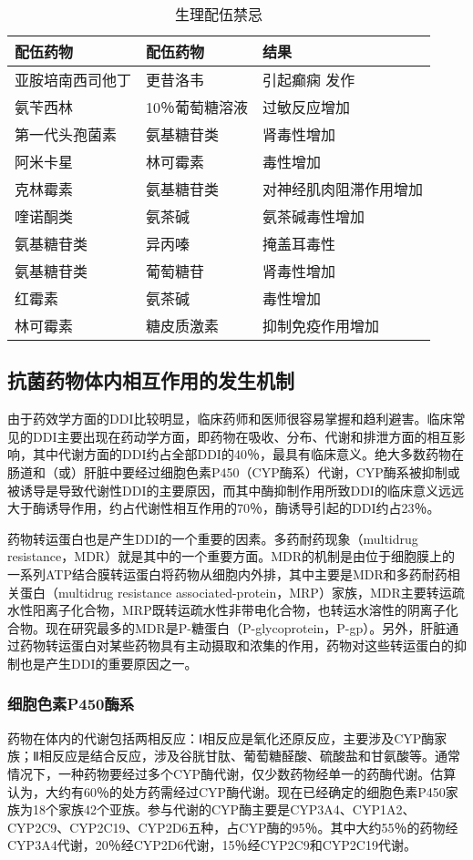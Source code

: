 \begin{longtable}[]{@{}lll@{}}
    \caption{生理配伍禁忌}
    \label{tab8-3}\\
\toprule
\endhead
配伍药物 & 配伍药物 & 结果\tabularnewline
\midrule
亚胺培南西司他丁 & 更昔洛韦 &
引起癫痫 发作\tabularnewline
氨苄西林 & 10％葡萄糖溶液 & 过敏反应增加\tabularnewline
第一代头孢菌素 & 氨基糖苷类 & 肾毒性增加\tabularnewline
阿米卡星 & 林可霉素 & 毒性增加\tabularnewline
克林霉素 & 氨基糖苷类 & 对神经肌肉阻滞作用增加\tabularnewline
喹诺酮类 & 氨茶碱 & 氨茶碱毒性增加\tabularnewline
氨基糖苷类 & 异丙嗪 & 掩盖耳毒性\tabularnewline
氨基糖苷类 & 葡萄糖苷 & 肾毒性增加\tabularnewline
红霉素 & 氨茶碱 & 毒性增加\tabularnewline
林可霉素 & 糖皮质激素 & 抑制免疫作用增加\tabularnewline
\bottomrule
\end{longtable}

\subsection{抗菌药物体内相互作用的发生机制}

由于药效学方面的DDI比较明显，临床药师和医师很容易掌握和趋利避害。临床常见的DDI主要出现在药动学方面，即药物在吸收、分布、代谢和排泄方面的相互影响，其中代谢方面的DDI约占全部DDI的40％，最具有临床意义。绝大多数药物在肠道和（或）肝脏中要经过细胞色素P450（CYP酶系）代谢，CYP酶系被抑制或被诱导是导致代谢性DDI的主要原因，而其中酶抑制作用所致DDI的临床意义远远大于酶诱导作用，约占代谢性相互作用的70％，酶诱导引起的DDI约占23％。

药物转运蛋白也是产生DDI的一个重要的因素。多药耐药现象（multidrug
resistance，MDR）就是其中的一个重要方面。MDR的机制是由位于细胞膜上的一系列ATP结合膜转运蛋白将药物从细胞内外排，其中主要是MDR和多药耐药相关蛋白（multidrug
resistance
associated-protein，MRP）家族，MDR主要转运疏水性阳离子化合物，MRP既转运疏水性非带电化合物，也转运水溶性的阴离子化合物。现在研究最多的MDR是P-糖蛋白（P-glycoprotein，P-gp）。另外，肝脏通过药物转运蛋白对某些药物具有主动摄取和浓集的作用，药物对这些转运蛋白的抑制也是产生DDI的重要原因之一。

\subsubsection{细胞色素P450酶系}

药物在体内的代谢包括两相反应：Ⅰ相反应是氧化还原反应，主要涉及CYP酶家族；Ⅱ相反应是结合反应，涉及谷胱甘肽、葡萄糖醛酸、硫酸盐和甘氨酸等。通常情况下，一种药物要经过多个CYP酶代谢，仅少数药物经单一的药酶代谢。估算认为，大约有60％的处方药需经过CYP酶代谢。现在已经确定的细胞色素P450家族为18个家族42个亚族。参与代谢的CYP酶主要是CYP3A4、CYP1A2、CYP2C9、CYP2C19、CYP2D6五种，占CYP酶的95％。其中大约55％的药物经CYP3A4代谢，20％经CYP2D6代谢，15％经CYP2C9和CYP2C19代谢。

